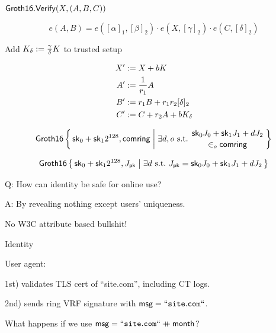 \documentclass{beamer}
\def\comring{\ensuremath{\mathsf{comring}}\xspace}
\begin{document}
\begin{frame}
	
$\mathsf{Groth16}.{\mathsf{Verify}}(X,(A,B,C))$
	
$$ e(A,B) = e([\alpha]_1, [\beta]_2) \cdot e(X, [\gamma]_2) \cdot e(C, [\delta]_2) $$

\pause\medskip

Add $K_\delta := {\gamma\over\delta} K$ to trusted setup

$$ \begin{aligned}
X' &:= X + b K \\
A' &:= {1 \over r_1} A \\
B' &:= r_1 B + r_1 r_2 [\delta]_2 \\
C' &:= C + r_2 A + b K_\delta \\
\end{aligned} $$

\end{frame}



\begin{frame}

$$ \mathsf{Groth16} \Setst{ \sk_0 + \sk_1 2^{128}, \comring }{
    \exists d,o \textrm{\ s.t.\ }
	\genfrac{}{}{0pt}{}{ \sk_0 J_0 + \sk_1 J_1 + d J_2 }{ \in_o \comring }
} $$

\pause\bigskip 

$$ \mathsf{Groth16} \Setst{ \sk_0 + \sk_1 2^{128}, J_\pk }{ 
	\exists d \textrm{\ s.t.\ }
	J_\pk = \sk_0 J_0 + \sk_1 J_1 + d J_2
} $$

\end{frame}



\begin{frame} %
	
Q: How can identity be safe for online use?

\bigskip

A: By revealing nothing except users' uniqueness.

\bigskip\bigskip

No W3C attribute based bullshit!

\end{frame}



\begin{frame}{Identity}

User agent: \\ \medskip

1st) validates TLS cert of ``site.com'', including CT logs. \\ \medskip

2nd) sends ring VRF signature with $\mathsf{msg} = \mathtt{``site.com``}$. \\ \medskip

\pause\bigskip\bigskip 

What happens if we use $\mathsf{msg} = \mathtt{``site.com``} \mathbin{+\mkern-10mu+} \mathsf{month}$?

\end{frame}
\end{document}
